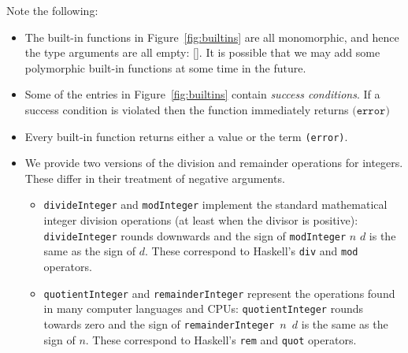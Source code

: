 \documentclass[a4paper]{article}
\newcommand{\keyword}[1]{\texttt{#1}}
\newcommand{\construct}[1]{\texttt{(} #1 \texttt{)}}
\newcommand{\errorU}{\construct{\keyword{error}}}
\begin{document}
Note the following:
\begin{itemize}
\item The built-in functions in Figure~\ref{fig:builtins}
are all monomorphic, and hence the type arguments are all empty: [].
It is possible that we may add some polymorphic built-in functions
at some time in the future.
\item Some of the entries in Figure~\ref{fig:builtins}
  contain \textit{success conditions}.  If a success condition is
  violated then the function immediately returns $\errorU$

\item Every built-in function returns either a value or the term \texttt{(error)}.

\item We provide two versions of the division and remainder operations
  for integers.  These differ in their treatment of negative
  arguments.

  \begin{itemize}

  \item \texttt{divideInteger} and \texttt{modInteger} implement the
    standard mathematical integer division operations (at least when
    the divisor is positive): \texttt{divideInteger} rounds
    downwards and the sign of \texttt{modInteger} $n$ $d$ is the same
    as the sign of $d$.  These correspond to Haskell's \texttt{div}
    and \texttt{mod} operators.

  \item \texttt{quotientInteger} and \texttt{remainderInteger}
    represent the operations found in many computer languages and
    CPUs: \texttt{quotientInteger} rounds towards zero and the sign
    of \texttt{remainderInteger $n$ $d$} is the same as the sign of
    $n$.  These correspond to Haskell's \texttt{rem} and \texttt{quot}
    operators.  \end{itemize}



\end{itemize}
\end{document}
